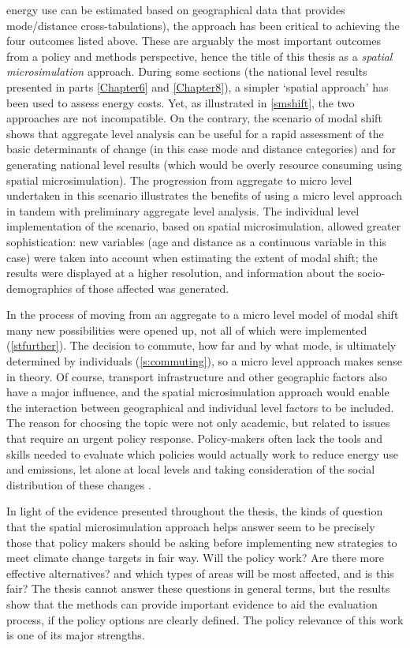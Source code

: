 energy use can be estimated based on geographical data that provides
mode/distance cross-tabulations), the approach has been critical to achieving the four
outcomes listed above. These are arguably the most important outcomes
from a policy and methods perspective, hence the title of this thesis as a
\emph{spatial microsimulation} approach. During some sections (the
national level results presented in parts \cref{Chapter6} and \cref{Chapter8}),
a simpler `spatial approach' has been used to assess energy costs.
Yet, as illustrated in \cref{smshift}, the two approaches are not incompatible.
On the contrary, the scenario of modal shift shows that aggregate level
analysis can be useful for a rapid assessment of the basic determinants of
change (in this case mode and distance categories) and for generating
national level results (which would be overly resource consuming
using spatial microsimulation). The progression from aggregate to micro level
undertaken in this scenario illustrates the benefits of using a micro level
approach in tandem with preliminary aggregate level analysis.
The individual level implementation of the scenario, based on spatial microsimulation,
allowed greater sophistication: new variables
(age and distance as a continuous variable in this case)
were taken into account when estimating the extent of modal shift;
the results were displayed at a higher resolution,
and information about the socio-demographics of those affected was generated.

In the process of moving from an aggregate to a micro level model of
modal shift many new possibilities were opened up, not
all of which were implemented (\cref{stfurther}). The decision to commute,
how far and by what mode, is ultimately determined
by individuals (\cref{s:commuting}), so a micro level approach makes sense in theory.
Of course, transport infrastructure and other geographic factors also have a major
influence, and the spatial microsimulation approach would enable the interaction
between geographical and individual level factors to be included.
The reason for choosing the topic
were not only academic, but related to issues that
require an urgent policy response. Policy-makers often lack the tools and skills needed to
evaluate which policies would actually work to reduce energy
use and emissions, let alone at local levels and taking consideration
of the social distribution of these changes \citep{Banister2008, Tribby2012}.

In light of the evidence presented throughout the thesis, the kinds of question that
the spatial microsimulation approach helps answer
seem to be precisely those that policy makers should be asking before implementing new
strategies to meet climate change targets in fair way. Will the policy work?
Are there more effective alternatives? and which types of areas will be most
affected, and is this fair? The thesis cannot answer these questions in general terms,
but the results show that the 
methods can provide important evidence to aid the evaluation process, if the policy options are
clearly defined. The policy relevance of this work is one of its major strengths.

